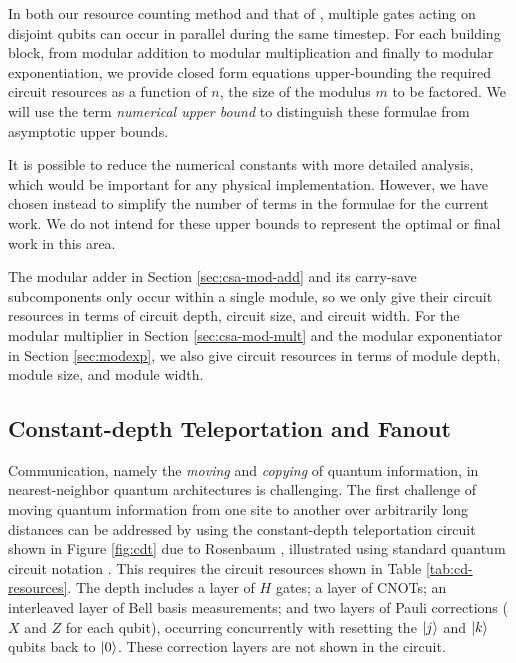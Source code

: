 \documentclass[twoside]{article}
\begin{document}
In both our resource counting method and that of \cite{Fowler2004,Kutin2006}, multiple gates acting on disjoint qubits
can occur in parallel during the same timestep. For each building block,
from modular addition to modular multiplication and finally to modular
exponentiation, we provide closed form equations upper-bounding the required circuit
resources as a function of $n$, the size of the modulus $m$ to be factored.
We will use the
term \emph{numerical upper bound} to distinguish these formulae from asymptotic
upper bounds.

It is possible to reduce the numerical constants with more detailed analysis,
which would be important for any physical implementation.
However, we have chosen instead to simplify the number of terms in the formulae
for the current work. We do not intend for these upper bounds to represent
the optimal or final work in this area.

The modular adder in Section \ref{sec:csa-mod-add} and its carry-save
subcomponents only occur within a single module, so we only give their
circuit resources in terms of circuit depth, circuit size, and circuit width. 
For the modular multiplier in
Section \ref{sec:csa-mod-mult} and the modular exponentiator in
Section \ref{sec:modexp}, we also give circuit resources in
terms of module depth, module size, and module width.

\subsection{Constant-depth Teleportation and Fanout}
\label{subsec:fanout}

Communication, namely the \emph{moving} and \emph{copying} of quantum information, in nearest-neighbor quantum architectures is challenging.
The first challenge of moving quantum information from one site to another over
arbitrarily long distances can be addressed by using
the constant-depth teleportation circuit
shown in Figure \ref{fig:cdt} due to Rosenbaum \cite{Rosenbaum2012}, illustrated using standard quantum circuit
notation \cite{Nielsen2000}. This requires the circuit resources shown in
Table \ref{tab:cd-resources}. The depth includes a layer of $H$ gates; a layer of CNOTs; an interleaved layer of Bell basis measurements; and two layers of
Pauli corrections ($X$ and $Z$ for each qubit), occurring concurrently with
resetting the $\left\vert{j}\right\rangle$ and $\left\vert{k}\right\rangle$ qubits back to $\left\vert{0}\right\rangle$.
These correction layers are not shown in the circuit.
\end{document}
